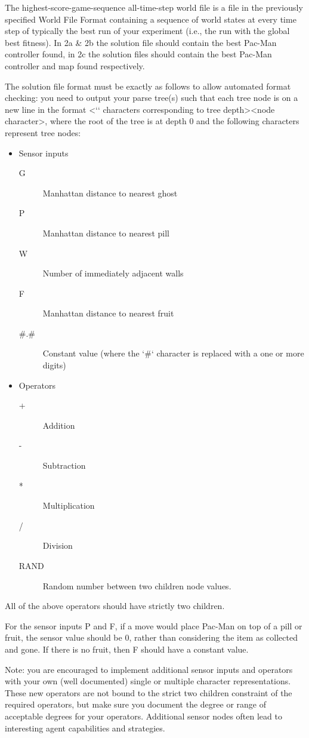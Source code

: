 \documentclass{article}
\begin{document}
The highest-score-game-sequence all-time-step world file is a file in the previously specified World File Format containing a sequence of world states at every time step of typically the best run of your experiment (i.e., the run with the global best fitness). In 2a \& 2b the solution file should contain the best Pac-Man controller found, in 2c the solution files should contain the best Pac-Man controller and map found respectively. 

The solution file format must be exactly as follows to allow automated format checking: you need to output your parse tree(s) such that each tree node is on a new line in the format \textless `\textbar` characters corresponding to tree depth\textgreater\textless node character\textgreater, where the root of the tree is at depth 0 and the following characters represent tree nodes:
\begin{itemize}
\item Sensor inputs
    \begin{description}
    \item[G] Manhattan distance to nearest ghost 
    \item[P] Manhattan distance to nearest pill 
    \item[W] Number of immediately adjacent walls 
    \item[F] Manhattan distance to nearest fruit 
    \item[\#.\#] Constant value (where the `\#` character is replaced with a one or more digits) 
    \end{description}
\item Operators
    \begin{description}
    \item[+] Addition 
    \item[-] Subtraction 
    \item[*] Multiplication 
    \item[/] Division 
    \item[RAND] Random number between two children node values. 
    \end{description}
\end{itemize}
All of the above operators should have strictly two children.  

For the sensor inputs P and F, if a move would place Pac-Man on top of a pill or fruit, the sensor value should be 0, rather than considering the item as collected and gone. If there is no fruit, then F should have a constant value.

Note: you are encouraged to implement additional sensor inputs and operators with your own (well documented) single or multiple character representations. These new operators are not bound to the strict two children constraint of the required operators, but make sure you document the degree or range of acceptable degrees for your operators. Additional sensor nodes often lead to interesting agent capabilities and strategies. 
 
\end{document}

